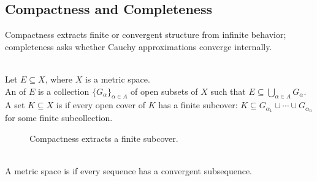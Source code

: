 \subsection{Compactness and Completeness}\label{subsec:compactness-and-completeness}

%


Compactness extracts finite or convergent structure from infinite behavior; completeness asks whether Cauchy approximations converge internally.

\begin{definition} \label{def:open-cover-and-compactness} \\
Let $E\subseteq X$, where $X$ is a metric space.\\
An  of $E$ is a collection $\{G_\alpha\}_{\alpha\in A}$ of open subsets of $X$ such that $E\subseteq\bigcup\limits_{\alpha\in A}G_\alpha$. A set $K\subseteq X$ is  if every open cover of $K$ has a finite subcover: $K\subseteq G_{\alpha_1}\cup\cdots\cup G_{\alpha_n}$ for some finite subcollection.
\end{definition}

\begin{figure}[H]
  \centering
  
  \caption{Compactness extracts a finite subcover.}
  \label{fig:compactness-finite-subcover}
\end{figure}

\begin{definition} \label{def:sequentially-compact-metric-space} \\
A metric space is  if every sequence has a convergent subsequence.
\end{definition}

